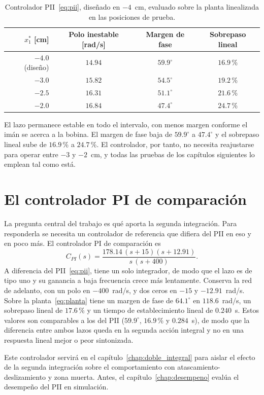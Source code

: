 \begin{table}[ht]
    \centering
    \caption[PII en el intervalo de operación]{Controlador PII~\eqref{eq:pii}, diseñado en $-4$~cm, evaluado sobre la planta linealizada en las posiciones de prueba.}
    \label{tab:pii_intervalo}
    \begin{tabular}{rccc}
        \hline
        $x_1^*$ [cm] & Polo inestable [rad/s] & Margen de fase & Sobrepaso lineal \\
        \hline
        $-4.0$ (diseño) & $14.94$ & $59.9^\circ$ & $16.9$\,\% \\
        $-3.0$ & $15.82$ & $54.5^\circ$ & $19.2$\,\% \\
        $-2.5$ & $16.31$ & $51.1^\circ$ & $21.6$\,\% \\
        $-2.0$ & $16.84$ & $47.4^\circ$ & $24.7$\,\% \\
        \hline
    \end{tabular}
\end{table}

El lazo permanece estable en todo el intervalo, con menos margen conforme el imán se acerca a la bobina. El margen de fase baja de $59.9^\circ$ a $47.4^\circ$ y el sobrepaso lineal sube de $16.9$\,\% a $24.7$\,\%. El controlador, por tanto, no necesita reajustarse para operar entre $-3$ y $-2$~cm, y todas las pruebas de los capítulos siguientes lo emplean tal como está.

\section{El controlador PI de comparación}\label{sec:pi}

La pregunta central del trabajo es qué aporta la segunda integración. Para responderla se necesita un controlador de referencia que difiera del PII en eso y en poco más. El controlador PI de comparación es
\begin{equation}
C_{PI}(s)=\frac{178.14\,(s+15)(s+12.91)}{s\,(s+400)} .
\label{eq:pi}
\end{equation}
A diferencia del PII~\eqref{eq:pii}, tiene un solo integrador, de modo que el lazo es de tipo uno y su ganancia a baja frecuencia crece más lentamente. Conserva la red de adelanto, con un polo en $-400$~rad/s, y dos ceros en $-15$ y $-12.91$~rad/s. Sobre la planta~\eqref{eq:planta} tiene un margen de fase de $64.1^\circ$ en $118.6$~rad/s, un sobrepaso lineal de $17.6$\,\% y un tiempo de establecimiento lineal de $0.240$~s. Estos valores son comparables a los del PII ($59.9^\circ$, $16.9$\,\% y $0.284$~s), de modo que la diferencia entre ambos lazos queda en la segunda acción integral y no en una respuesta lineal mejor o peor sintonizada.

Este controlador servirá en el capítulo~\ref{chap:doble_integral} para aislar el efecto de la segunda integración sobre el comportamiento con atascamiento-deslizamiento y zona muerta. Antes, el capítulo~\ref{chap:desempeno} evalúa el desempeño del PII en simulación.
